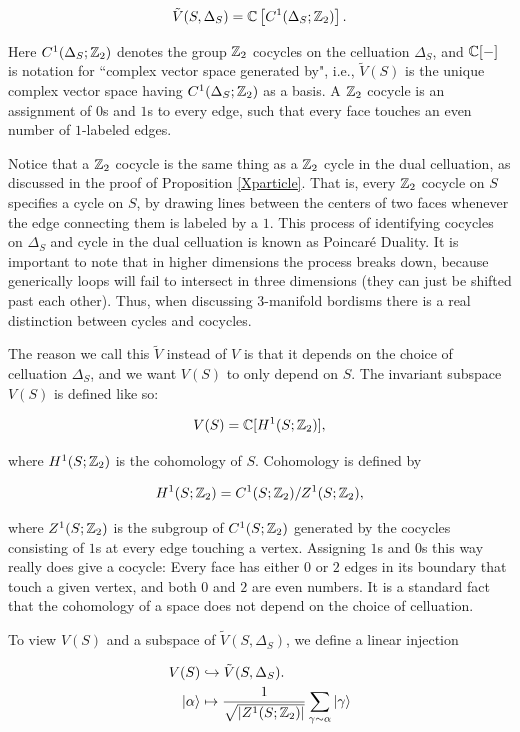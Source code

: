 \documentclass{article}
\theoremstyle{definition}
\numberwithin{figure}{section}
\begin{document}
$$\tilde{V}(S,\Delta_S)=\mathbb{C}\left[C^{1}(\Delta_S;\mathbb{Z}_2)\right].$$

Here $C^1(\Delta_S;\mathbb{Z}_2)$ denotes the group $\mathbb{Z}_2$ cocycles on the celluation $\Delta_S$, and $\mathbb{C}[-]$ is notation for ``complex vector space generated by", i.e., $\tilde{V}(S)$ is the unique complex vector space having $C^1(\Delta_S;\mathbb{Z}_2)$ as a basis. A $\mathbb{Z}_2$ cocycle is an assignment of $0$s and $1$s to every edge, such that every face touches an even number of $1$-labeled edges.

Notice that a $\mathbb{Z}_2$ cocycle is the same thing as a $\mathbb{Z}_2$ cycle in the dual celluation, as discussed in the proof of Proposition \ref{Xparticle}. That is, every $\mathbb{Z}_2$ cocycle on $S$ specifies a cycle on $S$, by drawing lines between the centers of two faces whenever the edge connecting them is labeled by a $1$. This process of identifying cocycles on $\Delta_S$ and cycle in the dual celluation is known as Poincaré Duality. It is important to note that in higher dimensions the process breaks down, because generically loops will fail to intersect in three dimensions (they can just be shifted past each other). Thus, when discussing 3-manifold bordisms there is a real distinction between cycles and cocycles.

The reason we call this $\tilde{V}$ instead of $V$ is that it depends on the choice of celluation $\Delta_S$, and we want $V(S)$ to only depend on $S$. The invariant subspace $V(S)$ is defined like so:

$$V(S)=\mathbb{C}[H^1(S;\mathbb{Z}_2)],$$

where $H^1(S;\mathbb{Z}_2)$ is the cohomology of $S$. Cohomology is defined by

$$H^1(S;\mathbb{Z}_2)=C^1(S;\mathbb{Z}_2)/Z^1(S;\mathbb{Z}_2),$$

where $Z^1(S;\mathbb{Z}_2)$ is the subgroup of $C^1(S;\mathbb{Z}_2)$ generated by the cocycles consisting of $1$s at every edge touching a vertex. Assigning $1$s and $0$s this way really does give a cocycle: Every face has either $0$ or $2$ edges in its boundary that touch a given vertex, and both $0$ and $2$ are even numbers. It is a standard fact that the cohomology of a space does not depend on the choice of celluation.

To view $V(S)$ and a subspace of $\tilde{V}(S,\Delta_S)$, we define a linear injection

\begin{align*}
V(S)&\hookrightarrow \tilde{V}(S,\Delta_S).\\
\left|\alpha\right>&\mapsto \frac{1}{\sqrt{|Z^1(S;\mathbb{Z}_2)|}}\sum_{\gamma\sim \alpha}\left|\gamma\right>
\end{align*}
\end{document}
